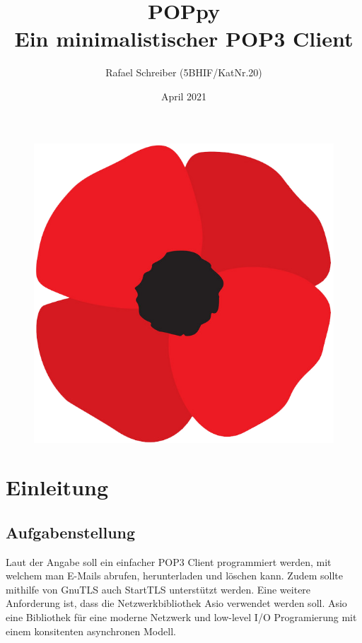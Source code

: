 \documentclass[12pt]{article}
\begin{document}
\clearpage
\thispagestyle{empty}
\author{Rafael Schreiber (5BHIF/KatNr.20)}
\date{April 2021}
\title{POPpy \\ Ein minimalistischer POP3 Client}
\maketitle
\begin{figure}[htbp]
    \centering
    \includegraphics[scale=0.2]{poppy_logo}
    \label{fig:situation1}
\end{figure}
\FloatBarrier
\clearpage
{}
\tableofcontents
\newpage

\section{Einleitung}
\subsection{Aufgabenstellung}
Laut der Angabe soll ein einfacher POP3 Client programmiert werden, mit welchem
man E-Mails abrufen, herunterladen und löschen kann. Zudem sollte mithilfe von
GnuTLS \cite{gnutls} auch StartTLS unterstützt werden.
\newline
Eine weitere Anforderung ist, dass die Netzwerkbibliothek Asio \cite{asio} 
verwendet werden soll. Asio eine Bibliothek für eine moderne Netzwerk und 
low-level I/O Programierung mit einem konsitenten asynchronen Modell.
\end{document}
